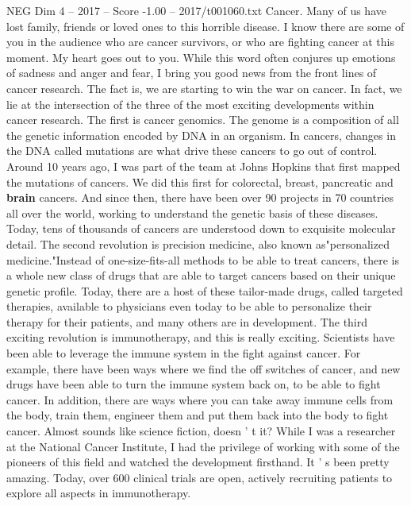 \begin{textsample}{NEG Dim 4 – 2017 – Score -1.00 – 2017/t001060.txt}  \label{ex:f4_neg_039}
Cancer.
Many of us have lost family, friends or loved ones to this horrible disease.
I know there are some of you in the audience who are cancer survivors, or who are fighting cancer at this moment.
My heart goes out to you.
While this word often conjures up emotions of sadness and anger and fear, I bring you good news from the front lines of cancer research.
The fact is, we are starting to win the war on cancer.
In fact, we lie at the intersection of the three of the most exciting developments within cancer research.
The first is cancer genomics.
The genome is a composition of all the genetic information encoded by DNA in an organism.
In cancers, changes in the DNA called mutations are what drive these cancers to go out of control.
Around 10 years ago, I was part of the team at Johns Hopkins that first mapped the mutations of cancers.
We did this first for colorectal, breast, pancreatic and \textbf{brain} cancers.
And since then, there have been over 90 projects in 70 countries all over the world, working to understand the genetic basis of these diseases.
Today, tens of thousands of cancers are understood down to exquisite molecular detail.
The second revolution is precision medicine, also known as"personalized medicine."Instead of one-size-fits-all methods to be able to treat cancers, there is a whole new class of drugs that are able to target cancers based on their unique genetic profile.
Today, there are a host of these tailor-made drugs, called targeted therapies, available to physicians even today to be able to personalize their therapy for their patients, and many others are in development.
The third exciting revolution is immunotherapy, and this is really exciting.
Scientists have been able to leverage the immune system in the fight against cancer.
For example, there have been ways where we find the off switches of cancer, and new drugs have been able to turn the immune system back on, to be able to fight cancer.
In addition, there are ways where you can take away immune cells from the body, train them, engineer them and put them back into the body to fight cancer.
Almost sounds like science fiction, doesn ' t it?
While I was a researcher at the National Cancer Institute, I had the privilege of working with some of the pioneers of this field and watched the development firsthand.
It ' s been pretty amazing.
Today, over 600 clinical trials are open, actively recruiting patients to explore all aspects in immunotherapy.

\end{textsample}
